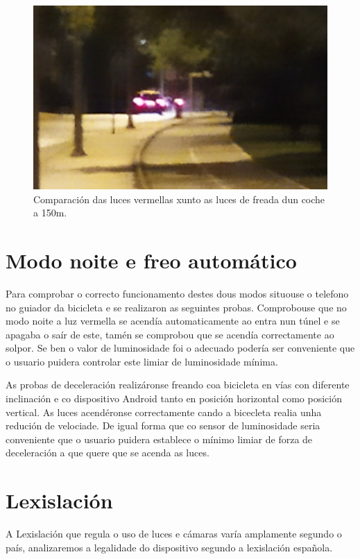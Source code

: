 \begin{figure}[tbp]
  \centering
  \includegraphics[scale=0.8]{imaxes/foto-coche.png}
  \caption{Comparación das luces vermellas xunto as luces de freada dun coche a 150m.}
  \label{fig:foto_coche}
\end{figure}

\section{Modo noite e freo automático}
Para comprobar o correcto funcionamento destes dous modos situouse o telefono no guiador da bicicleta e se realizaron as seguintes probas.
Comprobouse que no modo noite a luz vermella se acendía automaticamente ao entra nun túnel e se apagaba o saír de este, tamén se comprobou que se acendía correctamente ao solpor. Se ben o valor de luminosidade foi o adecuado podería ser conveniente que o usuario puidera controlar este limiar de luminosidade mínima.

As probas de deceleración realizáronse freando coa bicicleta en vías con diferente inclinación e co dispositivo Android tanto en posición horizontal como posición vertical. As luces acendéronse correctamente cando a bicecleta realia unha redución de velociade. De igual forma que co sensor de luminosidade seria conveniente que o usuario puidera establece o mínimo limiar de forza de deceleración a que quere que se acenda as luces.


\section{Lexislación}
A Lexislación que regula o uso de luces e cámaras varía amplamente segundo o país, analizaremos a legalidade do dispositivo segundo a lexislación española.

